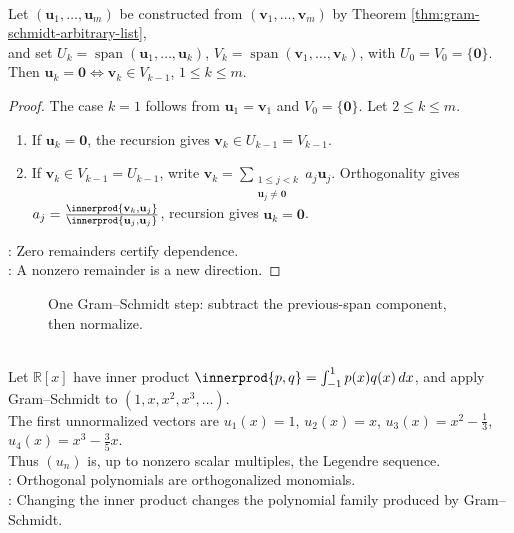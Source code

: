 \begin{corollary} \label{cor:gram-schmidt-zero-remainders} \\
Let $(\mathbf{u}_1,\ldots,\mathbf{u}_m)$ be constructed from $(\mathbf{v}_1,\ldots,\mathbf{v}_m)$ by Theorem \ref{thm:gram-schmidt-arbitrary-list},\\
and set $U_k=\operatorname{span}(\mathbf{u}_1,\ldots,\mathbf{u}_k)$, $V_k=\operatorname{span}(\mathbf{v}_1,\ldots,\mathbf{v}_k)$, with $U_0=V_0=\{\mathbf{0}\}$.\\
Then $\mathbf{u}_k=\mathbf{0}\Longleftrightarrow \mathbf{v}_k\in V_{k-1}$, $1\leq k\leq m$.
\begin{proof}
The case $k=1$ follows from $\mathbf{u}_1=\mathbf{v}_1$ and $V_0=\{\mathbf{0}\}$. Let $2\leq k\leq m$.
\begin{enumerate}[label=\roman*.]
\setlength{\itemsep}{0pt}
\item[$(\Rightarrow)$] If $\mathbf{u}_k=\mathbf{0}$, the recursion gives $\mathbf{v}_k\in U_{k-1}=V_{k-1}$.
\item[$(\Leftarrow)$] If $\mathbf{v}_k\in V_{k-1}=U_{k-1}$, write $\mathbf{v}_k=\sum_{\substack{1\leq j<k\\ \mathbf{u}_j\neq\mathbf{0}}}a_j\mathbf{u}_j$. Orthogonality gives $a_j=\frac{\innerprod{\mathbf{v}_k,\mathbf{u}_j}}{\innerprod{\mathbf{u}_j,\mathbf{u}_j}}$, recursion gives $\mathbf{u}_k=\mathbf{0}$.
\end{enumerate}
: Zero remainders certify dependence.\\
: A nonzero remainder is a new direction.
\end{proof}
\end{corollary}

\begin{figure}[H]
  \centering
  
  \caption{One Gram--Schmidt step: subtract the previous-span component, then normalize.}
  \label{fig:gram-schmidt-step}
\end{figure}

\begin{example} \label{ex:gram-schmidt-legendre-polynomials} \\
Let $\mathbb{R}[x]$ have inner product $\innerprod{p,q}=\int_{-1}^{1}p(x)q(x)\,dx$, and apply Gram--Schmidt to $(1,x,x^2,x^3,\ldots)$.\\
The first unnormalized vectors are $u_1(x)=1$, $u_2(x)=x$, $u_3(x)=x^2-\frac{1}{3}$, $u_4(x)=x^3-\frac{3}{5}x$.\\
Thus $(u_n)$ is, up to nonzero scalar multiples, the Legendre sequence.\\
: Orthogonal polynomials are orthogonalized monomials.\\
: Changing the inner product changes the polynomial family produced by Gram--Schmidt.
\end{example}

